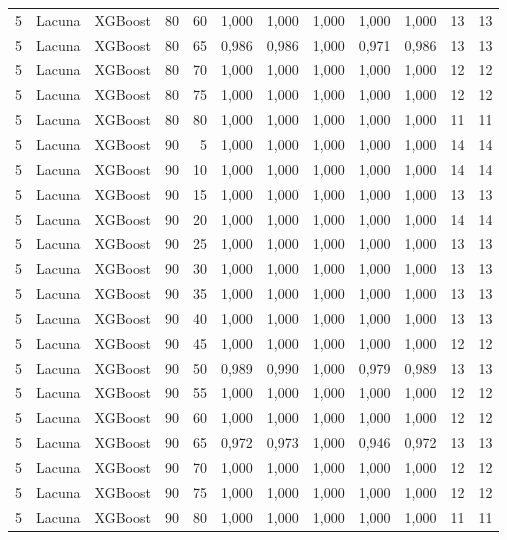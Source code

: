 \begin{longtable}{@{}rllrrrrrrrrr@{}}
5 & Lacuna & XGBoost & 80 & 60 & 1,000 & 1,000 & 1,000 & 1,000 & 1,000 & 13 & 13 \\
5 & Lacuna & XGBoost & 80 & 65 & 0,986 & 0,986 & 1,000 & 0,971 & 0,986 & 13 & 13 \\
5 & Lacuna & XGBoost & 80 & 70 & 1,000 & 1,000 & 1,000 & 1,000 & 1,000 & 12 & 12 \\
5 & Lacuna & XGBoost & 80 & 75 & 1,000 & 1,000 & 1,000 & 1,000 & 1,000 & 12 & 12 \\
5 & Lacuna & XGBoost & 80 & 80 & 1,000 & 1,000 & 1,000 & 1,000 & 1,000 & 11 & 11 \\
5 & Lacuna & XGBoost & 90 & 5 & 1,000 & 1,000 & 1,000 & 1,000 & 1,000 & 14 & 14 \\
5 & Lacuna & XGBoost & 90 & 10 & 1,000 & 1,000 & 1,000 & 1,000 & 1,000 & 14 & 14 \\
5 & Lacuna & XGBoost & 90 & 15 & 1,000 & 1,000 & 1,000 & 1,000 & 1,000 & 13 & 13 \\
5 & Lacuna & XGBoost & 90 & 20 & 1,000 & 1,000 & 1,000 & 1,000 & 1,000 & 14 & 14 \\
5 & Lacuna & XGBoost & 90 & 25 & 1,000 & 1,000 & 1,000 & 1,000 & 1,000 & 13 & 13 \\
5 & Lacuna & XGBoost & 90 & 30 & 1,000 & 1,000 & 1,000 & 1,000 & 1,000 & 13 & 13 \\
5 & Lacuna & XGBoost & 90 & 35 & 1,000 & 1,000 & 1,000 & 1,000 & 1,000 & 13 & 13 \\
5 & Lacuna & XGBoost & 90 & 40 & 1,000 & 1,000 & 1,000 & 1,000 & 1,000 & 13 & 13 \\
5 & Lacuna & XGBoost & 90 & 45 & 1,000 & 1,000 & 1,000 & 1,000 & 1,000 & 12 & 12 \\
5 & Lacuna & XGBoost & 90 & 50 & 0,989 & 0,990 & 1,000 & 0,979 & 0,989 & 13 & 13 \\
5 & Lacuna & XGBoost & 90 & 55 & 1,000 & 1,000 & 1,000 & 1,000 & 1,000 & 12 & 12 \\
5 & Lacuna & XGBoost & 90 & 60 & 1,000 & 1,000 & 1,000 & 1,000 & 1,000 & 12 & 12 \\
5 & Lacuna & XGBoost & 90 & 65 & 0,972 & 0,973 & 1,000 & 0,946 & 0,972 & 13 & 13 \\
5 & Lacuna & XGBoost & 90 & 70 & 1,000 & 1,000 & 1,000 & 1,000 & 1,000 & 12 & 12 \\
5 & Lacuna & XGBoost & 90 & 75 & 1,000 & 1,000 & 1,000 & 1,000 & 1,000 & 12 & 12 \\
5 & Lacuna & XGBoost & 90 & 80 & 1,000 & 1,000 & 1,000 & 1,000 & 1,000 & 11 & 11 \\

\end{longtable}
